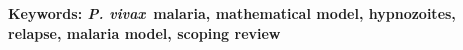 \documentclass[12pt]{article}
\newcommand{\pv}{\textit{P. vivax}}
\begin{document}
\begin{abstract}

\end{abstract}
\textbf{Keywords: \pv~malaria, mathematical model, hypnozoites, relapse, malaria model, scoping review} 
\end{document}
